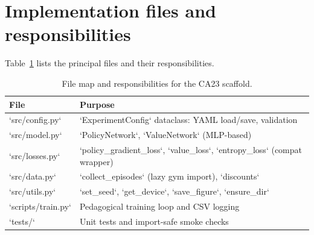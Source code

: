 \documentclass[11pt]{article}
\begin{document}
\section{Implementation files and responsibilities}
Table~\ref{tab:filemap} lists the principal files and their responsibilities.

\begin{table}[h]
\centering
\begin{tabular}{@{}ll@{}}\toprule
File & Purpose \\\midrule
`src/config.py` & `ExperimentConfig` dataclass: YAML load/save, validation \\
`src/model.py` & `PolicyNetwork`, `ValueNetwork` (MLP-based) \\
`src/losses.py` & `policy_gradient_loss`, `value_loss`, `entropy_loss` (compat wrapper) \\
`src/data.py` & `collect_episodes` (lazy gym import), `discounts` \\
`src/utils.py` & `set_seed`, `get_device`, `save_figure`, `ensure_dir` \\
`scripts/train.py` & Pedagogical training loop and CSV logging \\
`tests/` & Unit tests and import-safe smoke checks \\
\bottomrule
\end{tabular}
\caption{File map and responsibilities for the CA23 scaffold.}
\label{tab:filemap}
\end{table}
\end{document}
